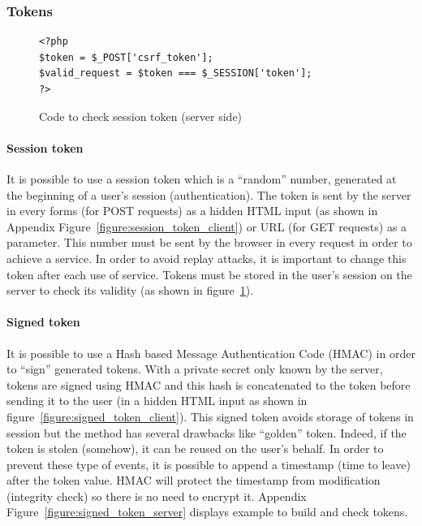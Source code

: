 \documentclass[a4paper,11pt,openany]{report}
\begin{document}
  \subsubsection{Tokens}
  
  \vspace*{-15pt}
  
    \begin{figure}
  \vspace*{-10pt}
  \begin{verbatim}
<?php
$token = $_POST['csrf_token'];
$valid_request = $token === $_SESSION['token'];
?>
  \end{verbatim}
  \vspace*{-10pt}
  \caption{Code to check session token (server side)}
  \label{figure:session_token_server}
  \end{figure}
  
  \paragraph{Session token}
  It is possible to use a session token which is a ``random'' number, generated at the beginning 
  of a user's session (authentication). The token is sent by the server in every forms (for POST 
  requests) as a hidden HTML input (as shown in Appendix Figure~\ref{figure:session_token_client}) or URL 
  (for GET requests) as a parameter. This number must be sent by the browser in every request in 
  order to achieve a service. In order to avoid replay attacks, it is important to change this token 
  after each use of service. Tokens must be stored in the user's session on the server to check its 
  validity (as shown in figure~\ref{figure:session_token_server}).
  
  \vspace*{-20pt}
  
  \paragraph{Signed token} %
  It is possible to use a Hash based Message Authentication Code (HMAC) in order to ``sign'' 
  generated tokens. With a private secret only known by the server, tokens are signed using 
  HMAC and this hash is concatenated to the token before sending it to the user (in a hidden 
  HTML input as shown in figure~\ref{figure:signed_token_client}). This signed token avoids 
  storage of tokens in session but the method has several drawbacks like ``golden'' token. 
  Indeed, if the token is stolen (somehow), it can be reused on the user's behalf. In order 
  to prevent these type of events, it is possible to append a timestamp (time to leave) after 
  the token value. HMAC will protect the timestamp from modification (integrity 
  check) so there is no need to encrypt it. Appendix Figure~\ref{figure:signed_token_server} 
  displays example to build and check tokens.
  
\end{document}
